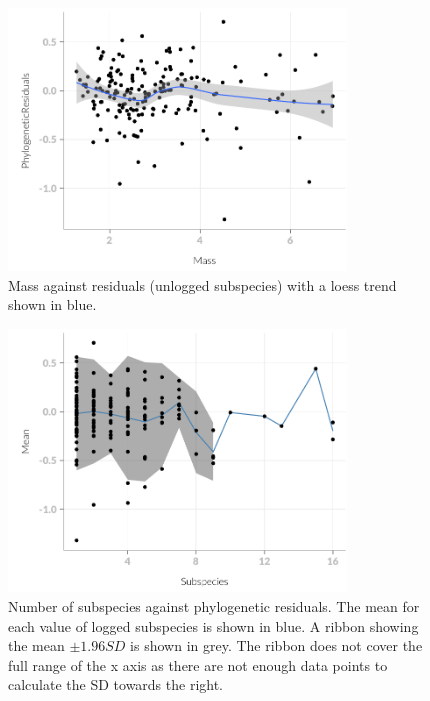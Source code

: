 \begin{knitrout}
\begin{figure}[t]

{\centering \includegraphics[width=0.8\textwidth]{figure/subsAnalysis-7} 

}

\caption[Mass against residuals  (unlogged subspecies) with a loess trend shown in blue]{Mass against residuals  (unlogged subspecies) with a loess trend shown in blue.}\label{fig:subsAnalysis}
\end{figure}

\begin{figure}[t]

{\centering \includegraphics[width=0.8\textwidth]{figure/subsAnalysis-8} 

}

\caption[Number of subspecies against phylogenetic residuals]{Number of subspecies against phylogenetic residuals. The mean for each value of logged subspecies is shown in blue. A ribbon showing the mean $\pm 1.96{SD}$ is shown in grey. The ribbon does not cover the full range of the x axis as there are not enough data points to calculate the SD towards the right.}\label{fig:subsAnalysis}
\end{figure}


\end{knitrout}
\clearpage


